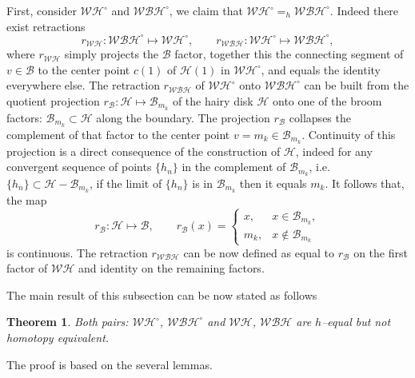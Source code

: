 \documentclass[reqno,12pt]{amsart}
\newtheorem{theorem}{Theorem}
\theoremstyle{ourremark}
\numberwithin{equation}{section}
\numberwithin{theorem}{section}
\begin{document}
 First, consider  $\mathcal{WH}^\circ$ and $\mathcal{WBH}^\circ$, we claim that $\mathcal{WH}^\circ=_h\mathcal{WBH}^\circ$. Indeed there exist retractions 
\begin{equation}\label{eq:retractions}
 r_{\mathcal{WH}}:\mathcal{WBH}^\circ\longmapsto \mathcal{WH}^\circ,\qquad r_{\mathcal{WBH}}:\mathcal{WH}^\circ\longmapsto \mathcal{WBH}^\circ,
\end{equation}
 where  $r_{\mathcal{WH}}$ simply projects the $\mathcal{B}$ factor, together this the connecting segment of $v\in\mathcal{B}$ to the center point $c(1)$ of $\mathcal{H}(1)$ in $\mathcal{WH}^\circ$, and equals the identity everywhere else. 
 The retraction $r_{\mathcal{WBH}}$ of $\mathcal{WH}^\circ$ onto $\mathcal{WBH}^\circ$ can be built from the quotient projection $r_{\mathcal{B}}:\mathcal{H}\longmapsto \mathcal{B}_{m_k}$ of the hairy disk $\mathcal{H}$ onto one of the broom factors: $\mathcal{B}_{m_k}\subset \mathcal{H}$ along the boundary.  The projection $r_{\mathcal{B}}$  collapses the complement of that factor to the center point $v=m_k\in\mathcal{B}_{m_k}$. Continuity of this projection is a direct consequence of the construction of $\mathcal{H}$, indeed for any convergent sequence of points $\{h_n\}$ in the complement of $\mathcal{B}_{m_k}$, i.e. $\{h_n\}\subset \mathcal{H}-\mathcal{B}_{m_k}$, if the limit of $\{h_n\}$ is in $\mathcal{B}_{m_k}$ then it equals $m_k$. It follows that, the map
 \[
  r_{\mathcal{B}}:\mathcal{H}\longmapsto \mathcal{B},\qquad r_{\mathcal{B}}(x)=\begin{cases}
   x, & x\in \mathcal{B}_{m_k},\\
   m_k, & x\not\in \mathcal{B}_{m_k}
  \end{cases}
 \] 
 is continuous. The retraction $r_{\mathcal{WBH}}$ can be now defined as equal to $r_{\mathcal{B}}$ on the first factor of $\mathcal{WH}$ and identity on the remaining factors. 
 
The main result of this subsection can be now stated as follows
\begin{theorem}\label{thm:WH-WBH}
 Both pairs: $\mathcal{WH}^\circ$, $\mathcal{WBH}^\circ$ and  $\mathcal{WH}$, $\mathcal{WBH}$ are $h$--equal but not homotopy equivalent.
\end{theorem}
{\noindent} The proof is based on the several lemmas.  
\end{document}

